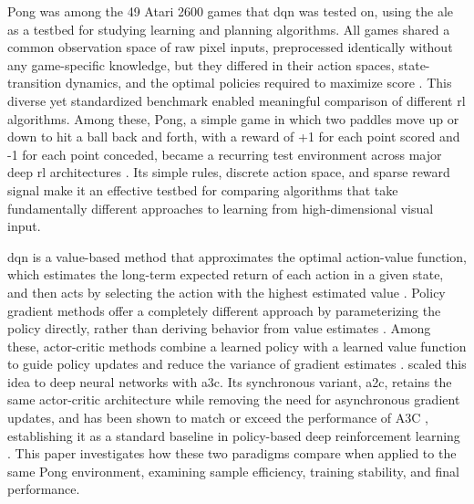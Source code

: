 Pong was among the 49 Atari 2600 games that \acrshort{dqn} was tested on, using the \acrfull{ale} \citep{bellemareArcadeLearningEnvironment2013} as a testbed for studying learning and planning algorithms. All games shared a common observation space of raw pixel inputs, preprocessed identically without any game-specific knowledge, but they differed in their action spaces, state-transition dynamics, and the optimal policies required to maximize score \citep[p.~437]{suttonReinforcementLearningIntroduction2020}. This diverse yet standardized benchmark enabled meaningful comparison of different \acrshort{rl} algorithms. Among these, Pong, a simple game in which two paddles move up or down to hit a ball back and forth, with a reward of +1 for each point scored and -1 for each point conceded, became a recurring test environment across major deep \acrshort{rl} architectures \citep{mnihHumanlevelControlDeep2015,mnihAsynchronousMethodsDeep2016,schulmanProximalPolicyOptimization2017}. Its simple rules, discrete action space, and sparse reward signal make it an effective testbed for comparing algorithms that take fundamentally different approaches to learning from high-dimensional visual input.

\acrshort{dqn} is a value-based method that approximates the optimal action-value function, which estimates the long-term expected return of each action in a given state, and then acts by selecting the action with the highest estimated value \citep[p.~529]{mnihHumanlevelControlDeep2015}. Policy gradient methods offer a completely different approach by parameterizing the policy directly, rather than deriving behavior from value estimates \citep[p.~321]{suttonReinforcementLearningIntroduction2020}. Among these, actor-critic methods combine a learned policy with a learned value function to guide policy updates and reduce the variance of gradient estimates \citep[p.~331]{suttonReinforcementLearningIntroduction2020}. \citet{mnihAsynchronousMethodsDeep2016} scaled this idea to deep neural networks with \acrfull{a3c}. Its synchronous variant, \acrfull{a2c}, retains the same actor-critic architecture while removing the need for asynchronous gradient updates, and has been shown to match or exceed the performance of A3C \citep{openaiBaselineACKTRA2C2017}, establishing it as a standard baseline in policy-based deep reinforcement learning \citep{dhariwalOpenAIBaselines2017}. This paper investigates how these two paradigms compare when applied to the same Pong environment, examining sample efficiency, training stability, and final performance.


